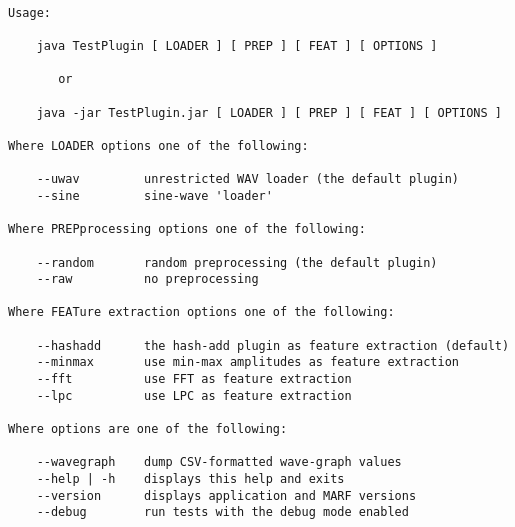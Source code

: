 \begin{verbatim}

Usage:

    java TestPlugin [ LOADER ] [ PREP ] [ FEAT ] [ OPTIONS ]

       or

    java -jar TestPlugin.jar [ LOADER ] [ PREP ] [ FEAT ] [ OPTIONS ]

Where LOADER options one of the following:

    --uwav         unrestricted WAV loader (the default plugin)
    --sine         sine-wave 'loader'

Where PREPprocessing options one of the following:

    --random       random preprocessing (the default plugin)
    --raw          no preprocessing

Where FEATure extraction options one of the following:

    --hashadd      the hash-add plugin as feature extraction (default)
    --minmax       use min-max amplitudes as feature extraction
    --fft          use FFT as feature extraction
    --lpc          use LPC as feature extraction

Where options are one of the following:

    --wavegraph    dump CSV-formatted wave-graph values
    --help | -h    displays this help and exits
    --version      displays application and MARF versions
    --debug        run tests with the debug mode enabled

\end{verbatim}
